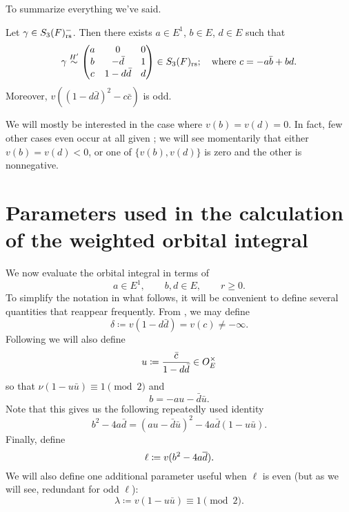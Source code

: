 To summarize everything we've said.
\begin{lemma}
  \label{lem:S3_abcd}
  Let $\gamma \in S_3(F)_{\mathrm{rs}}^-$.
  Then there exists $a \in E^1$, $b \in E$, $d \in E$ such that
  \[ \gamma \overset{H'}{\sim}
    \begin{pmatrix}
      a & 0 & 0 \\
      b & - \bar d & 1 \\
      c & 1 - d \bar d & d
    \end{pmatrix}
    \in S_3(F)_{\mathrm{rs}}; \quad \text{where $c = -a \bar b + b d$}. \]
  Moreover, $v\left( (1-d \bar d)^2 - c \bar c \right)$ is odd.
\end{lemma}

We will mostly be interested in the case where $v(b) = v(d) = 0$.
In fact, few other cases even occur at all given ;
we will see momentarily that either $v(b) = v(d) < 0$,
or one of $\{v(b), v(d)\}$ is zero and the other is nonnegative.

\section{Parameters used in the calculation of the weighted orbital integral}
\label{sec:param_orbital0}

We now evaluate the orbital integral in terms of
\[ a \in E^1, \qquad b, d \in E, \qquad r \ge 0. \]
To simplify the notation in what follows,
it will be convenient to define several quantities that reappear frequently.
From , we may define
\begin{equation}
  \delta \coloneqq v(1-d \bar d) = v(c) \neq -\infty.
  \label{eq:delta}
\end{equation}
Following \cite[Equation (4.3)]{ref:AFL} we will also define
\begin{equation}
  u \coloneqq \frac{\bar c}{1-d \bar d} \in O_E^\times
  \label{eq:u}
\end{equation}
so that $\nu(1-u \bar u) \equiv 1 \pmod 2$ and
\begin{equation}
  b = -au - \bar{d} \bar{u}.
  \label{eq:b}
\end{equation}
Note that this gives us the following repeatedly used identity
\begin{equation}
  b^2-4a\bar d = (au-\bar d \bar u)^2 - 4a\bar d(1-u\bar u).
  \label{eq:dos}
\end{equation}
Finally, define
\begin{equation}
  \ell \coloneqq v(b^2 - 4 a \overline d).
  \label{eq:ell}
\end{equation}
We will also define one additional parameter useful when $\ell$ is even
(but as we will see, redundant for odd $\ell$):
\begin{equation}
  \lambda \coloneqq v(1-u \bar u) \equiv 1 \pmod 2.
  \label{eq:lambda}
\end{equation}

